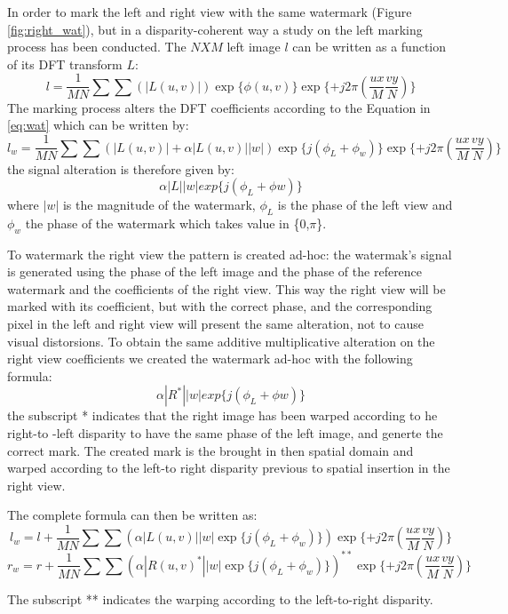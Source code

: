 In order to mark the left and right view with the same watermark (Figure \ref{fig:right_wat}), but in a disparity-coherent way a study on the left marking process has been conducted.
The $NXM$ left image $l$ can be written as a function of its DFT transform $L$:
$$ l =  \frac{1}{MN}\sum\sum(|L(u,v)|)\exp\{\phi (u,v)\} \exp\{+j2\pi(\frac{ux}{M}\frac{vy}{N})\}  $$
The marking process alters the DFT coefficients according to the Equation in \ref{eq:wat}
which can be written by:
$$ l_{w} = \frac{1}{MN}\sum\sum(|L(u,v)| + \alpha|L(u,v)||w|)\exp\{j(\phi_{L}+\phi_{w})\}\exp\{+j2\pi(\frac{ux}{M}\frac{vy}{N})\} $$
the signal alteration is therefore given by:
$$ \alpha|L||w|exp\{j(\phi_{L}+\phi{w})\} $$ 
where $|w|$ is the magnitude of the watermark, $\phi_{L}$ is the phase of the left view and $ \phi_{w}$ the phase of the watermark which takes value in \{0,$\pi$\}.


To watermark the right view the pattern is created ad-hoc: the watermak's signal is generated using the phase of the left image and the phase of the reference watermark and  the coefficients of the right view.\newline  
This way the right view will be marked with its coefficient, but with the correct phase, and the corresponding pixel in the left and right view will present the same alteration, not to cause visual distorsions.
To obtain the same additive multiplicative alteration on the right view coefficients we created the watermark ad-hoc with the following formula: 
$$ \alpha|R^{*}||w|exp\{j(\phi_{L}+\phi{w})\} $$ 
the subscript * indicates that the right image has been warped according to he right-to -left disparity to have the same phase of the left image, and generte the correct mark.
The created mark is the brought in then spatial domain and warped according to the left-to right disparity previous to spatial insertion in the right view.



The complete formula can then be written as: 
$$ l_{w} = l + \frac{1}{MN}\sum\sum(\alpha|L(u,v)||w|\exp\{j(\phi_{L}+\phi_{w})\})\exp\{+j2\pi(\frac{ux}{M}\frac{vy}{N})\} $$
$$ r_{w} = r + \frac{1}{MN}\sum\sum(\alpha|R(u,v)^{*}||w|\exp\{j(\phi_{L}+\phi_{w})\})^{**}\exp\{+j2\pi(\frac{ux}{M}\frac{vy}{N})\} $$

The subscript ** indicates the warping according to the left-to-right disparity.

